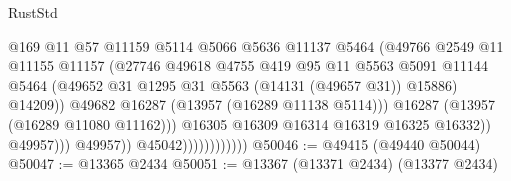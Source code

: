 \begin{lexlean}{RustStd}
\begin{coremodule}
                                              @169
                                              @11
                                              @57
                                              @11159
                                              @5114
                                              @5066
                                              @5636
                                              @11137
                                              @5464
                                              (@49766
                                                @2549
                                                @11
                                                @11155
                                                @11157
                                                (@27746
                                                  @49618
                                                  @4755
                                                  @419
                                                  @95
                                                  @11
                                                  @5563
                                                  @5091
                                                  @11144
                                                  @5464
                                                  (@49652
                                                    @31
                                                    @1295
                                                    @31
                                                    @5563
                                                    (@14131 (@49657 @31))
                                                    @15886)
                                                  @14209))
                                              @49682
                                              @16287
                                              (@13957 (@16289 @11138 @5114)))
                                            @16287
                                            (@13957 (@16289 @11080 @11162)))
                                          @16305
                                          @16309
                                          @16314
                                          @16319
                                          @16325
                                          @16332))
                                      @49957)))
                                @49957))
                            @45042))))))))))))
@50046 := @49415 (@49440 @50044)
@50047 := @13365 @2434
@50051 := @13367 (@13371 @2434) (@13377 @2434)

\end{coremodule}
\end{lexlean}

